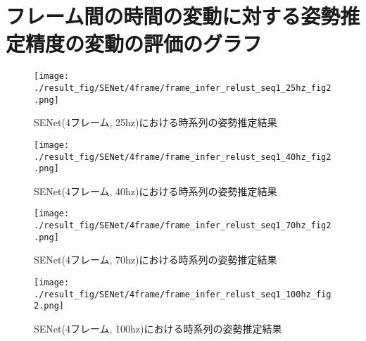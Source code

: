 \newpage
\section{フレーム間の時間の変動に対する姿勢推定精度の変動の評価のグラフ}\label{sec:Verify_MAE_Network_change_hz_Append}



\begin{figure}[thpb]
  \begin{minipage}[htpb]{1.0\hsize}
  \begin{center}
  \texttt{[image: ./result\_fig/SENet/4frame/frame\_infer\_relust\_seq1\_25hz\_fig2.png]}
  \caption{SENet(4フレーム, 25hz)における時系列の姿勢推定結果}
  \end{center}
  \end{minipage}
\end{figure}


\begin{figure}[thpb]
  \begin{minipage}[htpb]{1.0\hsize}
  \begin{center}
  \texttt{[image: ./result\_fig/SENet/4frame/frame\_infer\_relust\_seq1\_40hz\_fig2.png]}
  \caption{SENet(4フレーム, 40hz)における時系列の姿勢推定結果}
  \end{center}
  \end{minipage}
\end{figure}

\begin{figure}[thpb]
  \begin{minipage}[htpb]{1.0\hsize}
  \begin{center}
  \texttt{[image: ./result\_fig/SENet/4frame/frame\_infer\_relust\_seq1\_70hz\_fig2.png]}
  \caption{SENet(4フレーム, 70hz)における時系列の姿勢推定結果}
  \end{center}
  \end{minipage}
\end{figure}

\begin{figure}[thpb]
  \begin{minipage}[htpb]{1.0\hsize}
  \begin{center}
  \texttt{[image: ./result\_fig/SENet/4frame/frame\_infer\_relust\_seq1\_100hz\_fig2.png]}
  \caption{SENet(4フレーム, 100hz)における時系列の姿勢推定結果}
  \end{center}
  \end{minipage}
\end{figure}



